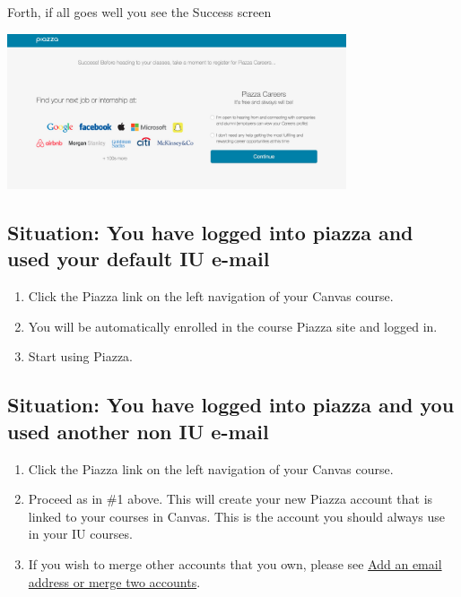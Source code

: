 Forth, if all goes well you see the Success screen

\includegraphics[width=0.75\textwidth]{images/piazza/image2.png}

\subsection*{Situation: You have logged into piazza and used your
  default IU e-mail}

\begin{enumerate}
\item Click the Piazza link on the left navigation of your Canvas
  course.
\item You will be automatically enrolled in the course Piazza site and
  logged in.
\item Start using Piazza.
\end{enumerate}

\subsection*{Situation: You have logged into piazza and you used
another non IU
e-mail}\label{situation-you-have-logged-into-piazza-and-you-used-another-non-iu-e-mail}

\begin{enumerate}
\item
  Click the Piazza link on the left navigation of your Canvas course.
\item
  Proceed as in \#1 above. This will create your new Piazza account that
  is linked to your courses in Canvas. This is the account you should
  always use in your IU courses.
\item
  If you wish to merge other accounts that you own, please see
  \href{https://www.google.com/url?q=http://support.piazza.com/customer/portal/articles/1646661-add-an-email-address-or-merge-two-accounts\&sa=D\&ust=1502127148503000\&usg=AFQjCNHyBFh3TMAtSDpFordYOfH0IE6kPA}{Add
  an email address or merge two accounts}.
\end{enumerate}

